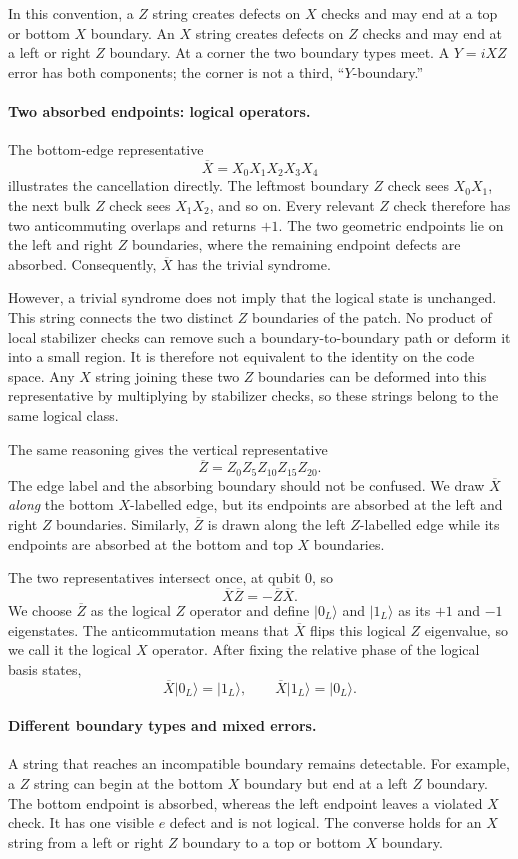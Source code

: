 \documentclass[11pt,a4paper]{article}
\newcommand{\ket}[1]{\lvert #1\rangle}
\newcommand{\XL}{\overline{X}}
\newcommand{\ZL}{\overline{Z}}
\begin{document}
In this convention, a $Z$ string creates defects on $X$ checks and may end at a top or bottom $X$ boundary. An $X$ string creates defects on $Z$ checks and may end at a left or right $Z$ boundary. At a corner the two boundary types meet. A $Y=iXZ$ error has both components; the corner is not a third, ``$Y$-boundary.''

\paragraph{Two absorbed endpoints: logical operators.}
The bottom-edge representative
\[
\XL=X_0X_1X_2X_3X_4
\]
illustrates the cancellation directly. The leftmost boundary $Z$ check
sees $X_0X_1$, the next bulk $Z$ check sees $X_1X_2$, and so on.
Every relevant $Z$ check therefore has two anticommuting overlaps and
returns $+1$. The two geometric endpoints lie on the left and right
$Z$ boundaries, where the remaining endpoint defects are absorbed.
Consequently, $\XL$ has the trivial syndrome.

However, a trivial syndrome does not imply that the logical state is
unchanged. This string connects the two distinct $Z$ boundaries of the
patch. No product of local stabilizer checks can remove such a
boundary-to-boundary path or deform it into a small region. It is
therefore not equivalent to the identity on the code space. Any $X$
string joining these two $Z$ boundaries can be deformed into this
representative by multiplying by stabilizer checks, so these strings
belong to the same logical class.

The same reasoning gives the vertical representative
\[
\ZL=Z_0Z_5Z_{10}Z_{15}Z_{20}.
\]
The edge label and the absorbing boundary should not be confused. We
draw $\XL$ \emph{along} the bottom $X$-labelled edge, but its endpoints
are absorbed at the left and right $Z$ boundaries. Similarly, $\ZL$ is
drawn along the left $Z$-labelled edge while its endpoints are absorbed
at the bottom and top $X$ boundaries.

The two representatives intersect once, at qubit $0$, so
\[
\XL\ZL=-\ZL\XL.
\]
We choose $\ZL$ as the logical $Z$ operator and define
$\ket{0_L}$ and $\ket{1_L}$ as its $+1$ and $-1$ eigenstates. The
anticommutation means that $\XL$ flips this logical $Z$ eigenvalue, so
we call it the logical $X$ operator. After fixing the relative phase
of the logical basis states,
\[
\XL\ket{0_L}=\ket{1_L},
\qquad
\XL\ket{1_L}=\ket{0_L}.
\]

\paragraph{Different boundary types and mixed errors.}
A string that reaches an incompatible boundary remains detectable. For example, a $Z$ string can begin at the bottom $X$ boundary but end at a left $Z$ boundary. The bottom endpoint is absorbed, whereas the left endpoint leaves a violated $X$ check. It has one visible $e$ defect and is not logical. The converse holds for an $X$ string from a left or right $Z$ boundary to a top or bottom $X$ boundary. 
\end{document}

